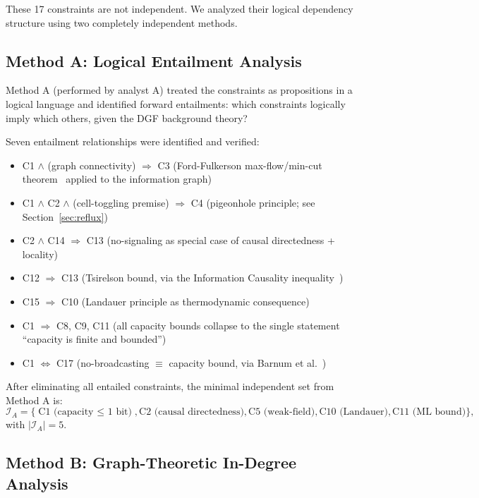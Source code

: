 \documentclass[12pt,a4paper]{article}
\theoremstyle{definition}
\theoremstyle{remark}
\begin{document}
These 17 constraints are not independent. We analyzed their logical dependency structure using two completely independent methods.

\subsection{Method A: Logical Entailment Analysis}

Method A (performed by analyst A) treated the constraints as propositions in a logical language and identified forward entailments: which constraints logically imply which others, given the DGF background theory?

Seven entailment relationships were identified and verified:
\begin{itemize}[leftmargin=*,itemsep=0pt,topsep=0pt]
\item C1 $\land$ (graph connectivity) $\Rightarrow$ C3 (Ford-Fulkerson max-flow/min-cut theorem~\cite{FordFulkerson1956} applied to the information graph)
\item C1 $\land$ C2 $\land$ (cell-toggling premise) $\Rightarrow$ C4 (pigeonhole principle; see Section~\ref{sec:reflux})
\item C2 $\land$ C14 $\Rightarrow$ C13 (no-signaling as special case of causal directedness + locality)
\item C12 $\Rightarrow$ C13 (Tsirelson bound, via the Information Causality inequality~\cite{Pawlowski2009})
\item C15 $\Rightarrow$ C10 (Landauer principle as thermodynamic consequence)
\item C1 $\Rightarrow$ C8, C9, C11 (all capacity bounds collapse to the single statement ``capacity is finite and bounded'')
\item C1 $\Leftrightarrow$ C17 (no-broadcasting $\equiv$ capacity bound, via Barnum et al.~\cite{Barnum2007})
\end{itemize}

After eliminating all entailed constraints, the minimal independent set from Method A is:
\begin{equation}
\mathcal{I}_A = \{\text{C1 (capacity $\leq$ 1 bit)}, \text{C2 (causal directedness)}, \text{C5 (weak-field)}, \text{C10 (Landauer)}, \text{C11 (ML bound)}\},
\end{equation}
with $|\mathcal{I}_A| = 5$.

\subsection{Method B: Graph-Theoretic In-Degree Analysis}
\end{document}
